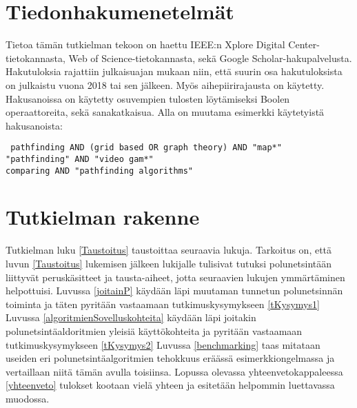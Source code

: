 \section{Tiedonhakumenetelmät}\label{tiedonhakuM}
Tietoa tämän tutkielman tekoon on haettu IEEE:n Xplore Digital 
Center-tietokannasta, Web of Science-tietokannasta, sekä Google 
Scholar-hakupalvelusta. Hakutuloksia rajattiin julkaisuajan mukaan niin, 
että suurin osa hakutuloksista on julkaistu vuona 2018 tai sen jälkeen. 
Myös aihepiirirajausta on käytetty. Hakusanoissa on käytetty osuvempien 
tulosten löytämiseksi Boolen operaattoreita, sekä sanakatkaisua. Alla on 
muutama esimerkki käytetyistä hakusanoista:
\begin{center}
\texttt{
	pathfinding AND (grid based OR graph theory) AND "map*"	\\
	"pathfinding" AND "video gam*"				\\
	comparing AND "pathfinding algorithms"			\\
}
\end{center}

\section{Tutkielman rakenne}\label{tRakenne}
Tutkielman luku \ref{Taustoitus} taustoittaa seuraavia lukuja. Tarkoitus on, 
että luvun \ref{Taustoitus} lukemisen jälkeen lukijalle tulisivat tutuksi 
polunetsintään liittyvät peruskäsitteet ja tausta-aiheet, jotta seuraavien 
lukujen ymmärtäminen helpottuisi. Luvussa \ref{joitainP} käydään läpi 
muutaman tunnetun polunetsinnän toiminta ja täten pyritään vastaamaan 
tutkimuskysymykseen \ref{tKysymys1} Luvussa 
\ref{algoritmienSovelluskohteita} käydään läpi joitakin 
polunetsintäaldoritmien yleisiä käyttökohteita ja pyritään vastaamaan 
tutkimuskysymykseen \ref{tKysymys2} Luvussa \ref{benchmarking} taas mitataan 
useiden eri polunetsintäalgoritmien tehokkuus eräässä esimerkkiongelmassa ja 
vertaillaan niitä tämän avulla toisiinsa. Lopussa olevassa 
yhteenvetokappaleessa \ref{yhteenveto} tulokset kootaan vielä yhteen ja 
esitetään helpommin luettavassa muodossa.
